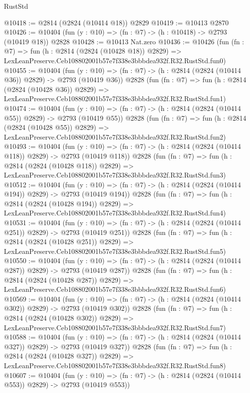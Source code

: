 \begin{lexlean}{RustStd}
\begin{coremodule}
@10418 := @2814 (@2824 (@10414 @18)) @2829
@10419 := @10413 @2870
@10426 := @10404 (fun (y : @10) => (fn : @7) -> (h : @10418) -> @2793 (@10419 @18)) @2828
@10428 := @10413 Nat.zero
@10436 := @10426
    (fun (fn : @7) =>
    fun (h : @2814 (@2824 (@10428 @18)) @2829) =>
    LexLeanPreserve.Ceb108802001b57e7f338e3bbbdea932f.R32.RustStd.fun0)
@10455 := @10404
    (fun (y : @10) => (fn : @7) -> (h : @2814 (@2824 (@10414 @36)) @2829) -> @2793 (@10419 @36))
    @2828
    (fun (fn : @7) =>
    fun (h : @2814 (@2824 (@10428 @36)) @2829) =>
    LexLeanPreserve.Ceb108802001b57e7f338e3bbbdea932f.R32.RustStd.fun1)
@10474 := @10404
    (fun (y : @10) => (fn : @7) -> (h : @2814 (@2824 (@10414 @55)) @2829) -> @2793 (@10419 @55))
    @2828
    (fun (fn : @7) =>
    fun (h : @2814 (@2824 (@10428 @55)) @2829) =>
    LexLeanPreserve.Ceb108802001b57e7f338e3bbbdea932f.R32.RustStd.fun2)
@10493 := @10404
    (fun (y : @10) => (fn : @7) -> (h : @2814 (@2824 (@10414 @118)) @2829) -> @2793 (@10419 @118))
    @2828
    (fun (fn : @7) =>
    fun (h : @2814 (@2824 (@10428 @118)) @2829) =>
    LexLeanPreserve.Ceb108802001b57e7f338e3bbbdea932f.R32.RustStd.fun3)
@10512 := @10404
    (fun (y : @10) => (fn : @7) -> (h : @2814 (@2824 (@10414 @194)) @2829) -> @2793 (@10419 @194))
    @2828
    (fun (fn : @7) =>
    fun (h : @2814 (@2824 (@10428 @194)) @2829) =>
    LexLeanPreserve.Ceb108802001b57e7f338e3bbbdea932f.R32.RustStd.fun4)
@10531 := @10404
    (fun (y : @10) => (fn : @7) -> (h : @2814 (@2824 (@10414 @251)) @2829) -> @2793 (@10419 @251))
    @2828
    (fun (fn : @7) =>
    fun (h : @2814 (@2824 (@10428 @251)) @2829) =>
    LexLeanPreserve.Ceb108802001b57e7f338e3bbbdea932f.R32.RustStd.fun5)
@10550 := @10404
    (fun (y : @10) => (fn : @7) -> (h : @2814 (@2824 (@10414 @287)) @2829) -> @2793 (@10419 @287))
    @2828
    (fun (fn : @7) =>
    fun (h : @2814 (@2824 (@10428 @287)) @2829) =>
    LexLeanPreserve.Ceb108802001b57e7f338e3bbbdea932f.R32.RustStd.fun6)
@10569 := @10404
    (fun (y : @10) => (fn : @7) -> (h : @2814 (@2824 (@10414 @302)) @2829) -> @2793 (@10419 @302))
    @2828
    (fun (fn : @7) =>
    fun (h : @2814 (@2824 (@10428 @302)) @2829) =>
    LexLeanPreserve.Ceb108802001b57e7f338e3bbbdea932f.R32.RustStd.fun7)
@10588 := @10404
    (fun (y : @10) => (fn : @7) -> (h : @2814 (@2824 (@10414 @327)) @2829) -> @2793 (@10419 @327))
    @2828
    (fun (fn : @7) =>
    fun (h : @2814 (@2824 (@10428 @327)) @2829) =>
    LexLeanPreserve.Ceb108802001b57e7f338e3bbbdea932f.R32.RustStd.fun8)
@10607 := @10404
    (fun (y : @10) => (fn : @7) -> (h : @2814 (@2824 (@10414 @553)) @2829) -> @2793 (@10419 @553))

\end{coremodule}
\end{lexlean}
